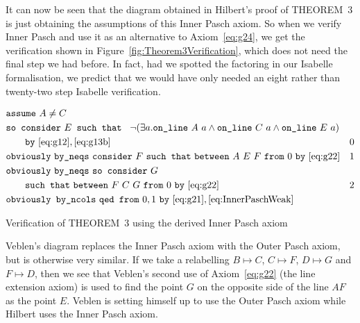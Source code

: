 It can now be seen that the diagram obtained in Hilbert's proof of THEOREM~3 is just obtaining the assumptions of this Inner Pasch axiom. So when we verify Inner Pasch and use it as an alternative to Axiom~\ref{eq:g24}, we get the verification shown in Figure~\ref{fig:Theorem3Verification}, which does not need the final step we had before. In fact, had we spotted the factoring in our Isabelle formalisation, we predict that we would have only needed an eight rather than twenty-two step Isabelle verification.

\begin{boxedfigure}
\begin{align*}
  &\code{assume}\ A\neq C\\
  &\code{so consider}\ E \code{ such that }\ \Triangle{a}{A}{C}{E}\\
  &\qquad\code{by}\ \eqref{eq:g12},\eqref{eq:g13b}& 0\\
  &\code{obviously}\ \code{by\_neqs}\ \code{consider}\ F\ \code{such that}\ \between{A}{E}{F}\ \code{from}\ 0\ \code{by}\ \eqref{eq:g22} & 1\\
  &\code{obviously}\ \code{by\_neqs}\ \code{so consider}\ G\\
  &\qquad\code{such that}\ \between{F}{C}{G}\ \code{from}\ 0\ \code{by}\ \eqref{eq:g22} & 2\\
  &\code{obviously by\_ncols}\ \code{qed from}\ 0,1\ \code{by}\ \eqref{eq:g21},\eqref{eq:InnerPaschWeak}
\end{align*}
\caption{Verification of THEOREM~3 using the derived Inner Pasch axiom}
\label{fig:Theorem3Verification}
\end{boxedfigure}

Veblen's diagram replaces the Inner Pasch axiom with the Outer Pasch axiom, but is otherwise very similar. If we take a relabelling $B \mapsto C$, $C \mapsto F$, $D \mapsto G$ and $F \mapsto D$, then we see that Veblen's second use of Axiom~\ref{eq:g22} (the line extension axiom) is used to find the point $G$ on the opposite side of the line $AF$ as the point $E$. Veblen is setting himself up to use the Outer Pasch axiom while Hilbert uses the Inner Pasch axiom.

